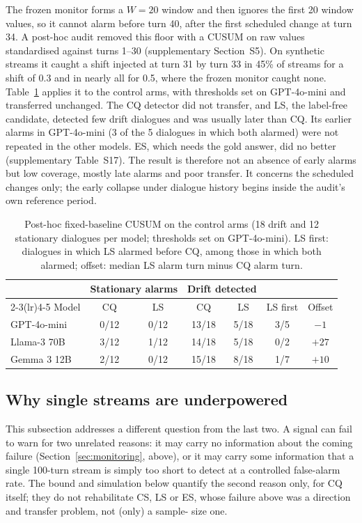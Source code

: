 The frozen monitor forms a $W=20$ window and then ignores the first 20 window
values, so it cannot alarm before turn 40, after the first scheduled change at
turn 34. A post-hoc audit removed this floor with a CUSUM on raw values
standardised against turns 1--30 (supplementary Section~S5). On synthetic
streams it caught a shift injected at turn 31 by turn 33 in 45\% of streams for
a shift of 0.3 and in nearly all for 0.5, where the frozen monitor caught none.
Table~\ref{tab:audit} applies it to the control arms, with thresholds set on
GPT-4o-mini and transferred unchanged. The CQ detector did not transfer, and
LS, the label-free candidate, detected few drift dialogues and was usually
later than CQ. Its earlier alarms in GPT-4o-mini (3 of the 5 dialogues in which
both alarmed) were not repeated in the other models. ES, which needs the gold
answer, did no better (supplementary Table~S17). The result is therefore not
an absence of early alarms but low coverage, mostly late alarms and poor
transfer. It concerns the scheduled changes only; the early collapse under
dialogue history begins inside the audit's own reference period.

\begin{table}[!htbp]
\centering
\caption{Post-hoc fixed-baseline CUSUM on the control arms (18 drift and 12
stationary dialogues per model; thresholds set on GPT-4o-mini). LS first:
dialogues in which LS alarmed before CQ, among those in which both alarmed;
offset: median LS alarm turn minus CQ alarm turn.}
\label{tab:audit}
\small
\begin{tabular}{lcccccc}
\toprule
 & \multicolumn{2}{c}{Stationary alarms} & \multicolumn{2}{c}{Drift detected} & & \\
\cmidrule(lr){2-3}\cmidrule(lr){4-5}
Model & CQ & LS & CQ & LS & LS first & Offset\\
\midrule
GPT-4o-mini & 0/12 & 0/12 & 13/18 & 5/18 & 3/5 & $-1$\\
Llama-3 70B & 3/12 & 1/12 & 14/18 & 5/18 & 0/2 & $+27$\\
Gemma 3 12B & 2/12 & 0/12 & 15/18 & 8/18 & 1/7 & $+10$\\
\bottomrule
\end{tabular}
\end{table}

\subsection{Why single streams are underpowered}

This subsection addresses a different question from the last two. A signal
can fail to warn for two unrelated reasons: it may carry no information about
the coming failure (Section~\ref{sec:monitoring}, above), or it may carry some
information that a single 100-turn stream is simply too short to detect at a
controlled false-alarm rate. The bound and simulation below quantify the
second reason only, for CQ itself; they do not rehabilitate CS, LS or ES,
whose failure above was a direction and transfer problem, not (only) a sample-
size one.

